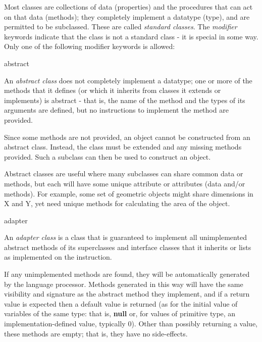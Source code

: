 Most classes are collections of data (properties) and the procedures
that can act on that data (methods); they completely implement a
datatype (type), and are permitted to be subclassed.
These are called \emph{standard classes}.
The \emph{modifier} keywords indicate that the class is not a standard
class - it is special in some way.
Only one of the following modifier keywords is allowed:
\begin{description}
\item{abstract}

An \emph{abstract class} does not completely implement a datatype; one
or more of the methods that it defines (or which it inherits from
classes it extends or implements) is abstract - that is, the name
of the method and the types of its arguments are defined, but no
instructions to implement the method are provided.
 
Since some methods are not provided, an object cannot be constructed
from an abstract class.  Instead, the class must be extended and any
missing methods provided.  Such a subclass can then be used to construct
an object.
 
Abstract classes are useful where many subclasses can share common data
or methods, but each will have some unique attribute or attributes (data
and/or methods).  For example, some set of geometric objects might share
dimensions in X and Y, yet need unique methods for calculating the area
of the object.
\item{adapter}

An \emph{adapter class} is a class that is guaranteed to implement all
unimplemented abstract methods of its superclasses and interface classes
that it inherits or lists as implemented on the  instruction.
 
If any unimplemented methods are found, they will be automatically
generated by the language processor.  Methods generated in this way will
have the same visibility and signature as the abstract method they
implement, and if a return value is expected then a default value is
returned (as for the initial value of variables of the same type: that
is, \textbf{null} or, for values of primitive type, an
implementation-defined value, typically 0).  Other than possibly
returning a value, these methods are empty; that is, they have no
side-effects.
 

\end{description}
